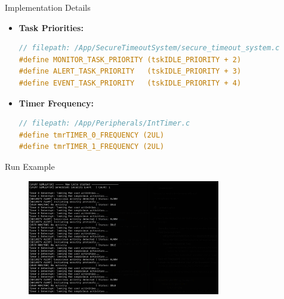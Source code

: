 \begin{frame}[fragile]{Implementation Details}
    \begin{itemize}
        \item \textbf{Task Priorities:}
            \begin{lstlisting}[language=C]
// filepath: /App/SecureTimeoutSystem/secure_timeout_system.c
#define MONITOR_TASK_PRIORITY (tskIDLE_PRIORITY + 2)
#define ALERT_TASK_PRIORITY   (tskIDLE_PRIORITY + 3)
#define EVENT_TASK_PRIORITY   (tskIDLE_PRIORITY + 4)
            \end{lstlisting}
        \item \textbf{Timer Frequency:}
            \begin{lstlisting}[language=C]
// filepath: /App/Peripherals/IntTimer.c
#define tmrTIMER_0_FREQUENCY (2UL)
#define tmrTIMER_1_FREQUENCY (2UL)
            \end{lstlisting}
    \end{itemize}
\end{frame}

\begin{frame}{Run Example}
    \begin{figure}[h]
        \centering
        \includegraphics[width=0.75\textwidth]{images/run_example.png}
    \end{figure}
\end{frame}
